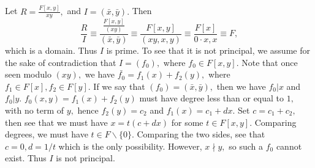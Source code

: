 \documentclass{article}
\begin{document}
\section{} %
\section{} %
Let $R=\frac{F[x,y]}{xy},$ and $I=(\bar{x},\bar{y}).$ Then $$\frac{R}{I} \equiv \frac{\frac{F[x,y]}{(xy)}}{(\bar{x},\bar{y})} \equiv \frac{F[x,y]}{(xy,x,y)} \equiv \frac{F[x]}{0 \cdot x,x} \equiv F,$$ which is a domain. Thus $I$ is prime. To see that it is not principal, we assume for the sake of contradiction that $I=(f_0),$ where $f_0 \in F[x,y].$ Note that once seen modulo $(xy),$ we have $\bar{f_0}=f_1(x)+f_2(y),$ where $f_1 \in F[x], f_2 \in F[y].$ If we say that $(f_0)=(\bar{x},\bar{y}),$ then we have $f_0 | x$ and $f_0 | y.$ $f_0(x,y)=f_1(x)+f_2(y)$ must have degree less than  or equal to $1,$ with no term of $y,$ hence $f_2(y)=c_2$ and $f_1(x)=c_1+dx.$ Set $c=c_1+c_2,$ then see that we must have $x=t(c+dx)$ for some $t \in F[x,y].$ Comparing degrees, we must have $t \in F \backslash \{0\}.$ Comparing the two sides, see that $c=0, d=1/t$ which is the only possibility. However, $x \nmid y,$ so such a $f_0$ cannot exist. Thus $I$ is not principal.

 
\end{document}

